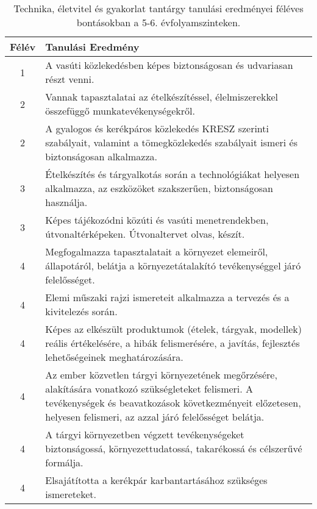        
           \begin{longtable}{c | p{12cm} }
            \caption[Technika, életvitel és gyakorlat 5-6.]{Technika, életvitel és gyakorlat tantárgy tanulási eredményei féléves bontásokban a 5-6. évfolyamszinteken. }  \\

            \textbf{Félév} & \textbf{Tanulási Eredmény} \\
            \hline
            \endhead
                                
                                          1 &  A vasúti közlekedésben képes biztonságosan és udvariasan részt venni. \\ \hline
                                      
                                
                                          2 &  Vannak tapasztalatai az ételkészítéssel, élelmiszerekkel összefüggő munkatevékenységekről. \\ \hline
                                          2 &  A gyalogos és kerékpáros közlekedés KRESZ szerinti szabályait, valamint a tömegközlekedés szabályait ismeri és biztonságosan alkalmazza. \\ \hline
                                      
                                
                                          3 &  Ételkészítés és tárgyalkotás során a technológiákat helyesen alkalmazza, az eszközöket szakszerűen, biztonságosan használja. \\ \hline
                                          3 &  Képes tájékozódni közúti és vasúti menetrendekben, útvonaltérképeken. Útvonaltervet olvas, készít. \\ \hline
                                      
                                
                                          4 &  Megfogalmazza tapasztalatait a környezet elemeiről, állapotáról, belátja a környezetátalakító tevékenységgel járó felelősséget. \\ \hline
                                          4 &  Elemi műszaki rajzi ismereteit alkalmazza a tervezés és a kivitelezés során. \\ \hline
                                          4 &  Képes az elkészült produktumok (ételek, tárgyak, modellek) reális értékelésére, a hibák felismerésére, a javítás, fejlesztés lehetőségeinek meghatározására. \\ \hline
                                          4 &  Az ember közvetlen tárgyi környezetének megőrzésére, alakítására vonatkozó szükségleteket felismeri. A tevékenységek és beavatkozások következményeit előzetesen, helyesen felismeri, az azzal járó felelősséget belátja. \\ \hline
                                          4 &  A tárgyi környezetben végzett tevékenységeket biztonságossá, környezettudatossá, takarékossá és célszerűvé formálja. \\ \hline
                                          4 &  Elsajátította a kerékpár karbantartásához szükséges ismereteket. \\ \hline
                                      

\end{longtable}
